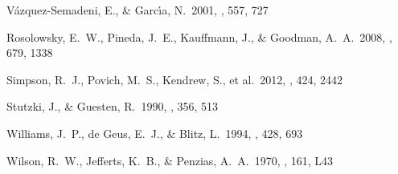 \begin{thebibliography}{16}
 V{\'a}zquez-Semadeni, E., \& Garc{\'{\i}}a, N.\ 2001, \apj, 557, 727

 Rosolowsky, E.~W.,
Pineda, J.~E., Kauffmann, J., \& Goodman, A.~A.\ 2008, \apj, 679, 1338

 Simpson, R.~J., Povich,
M.~S., Kendrew, S., et al.\ 2012, \mnras, 424, 2442

 Stutzki, J., \& Guesten, R.\ 1990, \apj, 356, 513

 Williams, J.~P., de
Geus, E.~J., \& Blitz, L.\ 1994, \apj, 428, 693

 Wilson, R.~W., Jefferts,
K.~B., \& Penzias, A.~A.\ 1970, \apjl, 161, L43

\end{thebibliography}
